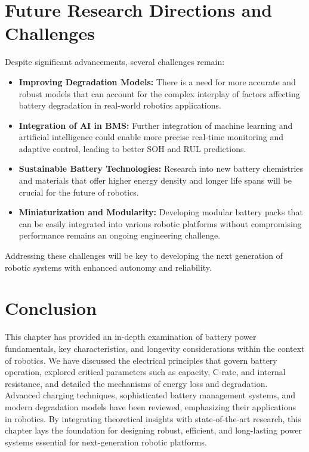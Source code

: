 \section{Future Research Directions and Challenges}
Despite significant advancements, several challenges remain:
\begin{itemize}
    \item \textbf{Improving Degradation Models:} There is a need for more accurate and robust models that can account for the complex interplay of factors affecting battery degradation in real-world robotics applications.
    \item \textbf{Integration of AI in BMS:} Further integration of machine learning and artificial intelligence could enable more precise real-time monitoring and adaptive control, leading to better SOH and RUL predictions.
    \item \textbf{Sustainable Battery Technologies:} Research into new battery chemistries and materials that offer higher energy density and longer life spans will be crucial for the future of robotics.
    \item \textbf{Miniaturization and Modularity:} Developing modular battery packs that can be easily integrated into various robotic platforms without compromising performance remains an ongoing engineering challenge.
\end{itemize}
Addressing these challenges will be key to developing the next generation of robotic systems with enhanced autonomy and reliability.

\section{Conclusion}
This chapter has provided an in-depth examination of battery power fundamentals, key characteristics, and longevity considerations within the context of robotics. We have discussed the electrical principles that govern battery operation, explored critical parameters such as capacity, C-rate, and internal resistance, and detailed the mechanisms of energy loss and degradation. Advanced charging techniques, sophisticated battery management systems, and modern degradation models have been reviewed, emphasizing their applications in robotics. By integrating theoretical insights with state-of-the-art research, this chapter lays the foundation for designing robust, efficient, and long-lasting power systems essential for next-generation robotic platforms.
